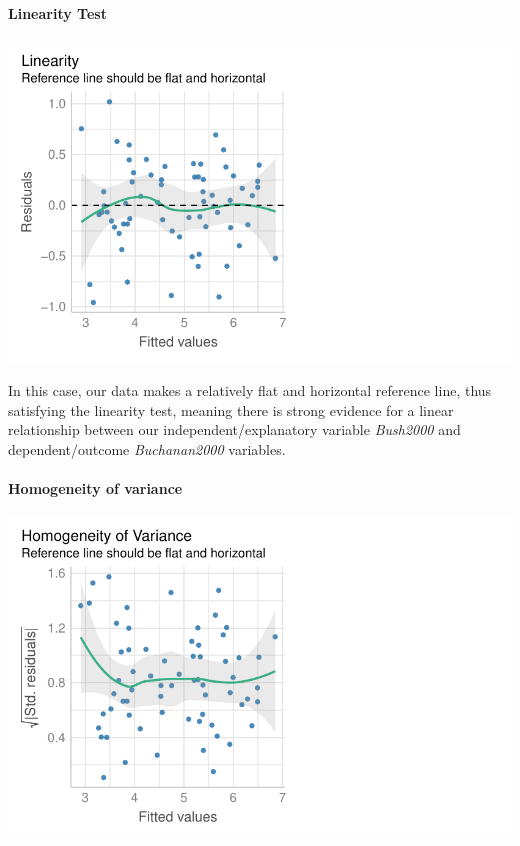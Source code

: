 \documentclass[
  letterpaper,
  DIV=11,
  numbers=noendperiod]{scrartcl}
\let\oldparagraph\paragraph
\renewcommand{\paragraph}[1]{\oldparagraph{#1}\mbox{}}
\begin{document}
\hypertarget{linearity-test}{%
\paragraph{Linearity Test}\label{linearity-test}}

\includegraphics{sds-291_s-24_case-study-template_files/figure-pdf/unnamed-chunk-7-1.pdf}

In this case, our data makes a relatively flat and horizontal reference
line, thus satisfying the linearity test, meaning there is strong
evidence for a linear relationship between our independent/explanatory
variable \emph{Bush2000} and dependent/outcome \emph{Buchanan2000}
variables.

\hypertarget{homogeneity-of-variance}{%
\paragraph{Homogeneity of variance}\label{homogeneity-of-variance}}

\includegraphics{sds-291_s-24_case-study-template_files/figure-pdf/unnamed-chunk-8-1.pdf}
\end{document}
